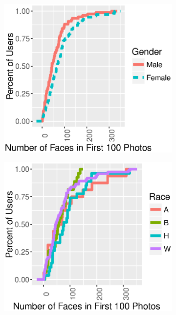 \begin{figure}[t]
  \centering
  \begin{subfigure}[b]{.21\textwidth}
    \centering
    \includegraphics[width=\linewidth]{fig/census/face_cdf_gender.eps}
    \caption{}
    \label{fig:face_cdf_gender}
  \end{subfigure}
  \begin{subfigure}[b]{.21\textwidth}
    \centering
    \includegraphics[width=\linewidth]{fig/census/face_cdf_race.eps}
    \caption{}
    \label{fig:face_cdf_race}
  \end{subfigure}
  \caption{}
  \label{fig:face_cdf}
\end{figure}

